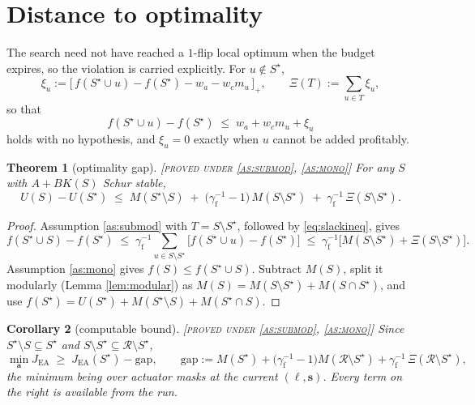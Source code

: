 \documentclass[11pt]{article}
\newtheorem{theorem}{Theorem}
\newtheorem{corollary}[theorem]{Corollary}
\theoremstyle{definition}
\theoremstyle{remark}
\newcommand{\JEA}{J_{\mathrm{EA}}}
\newcommand{\gf}{\gamma_{\mathrm{f}}}
\newcommand{\Rset}{\mathcal{R}}
\newcommand{\Sstar}{S^{\star}}
\newcommand{\tagged}[1]{\textsc{[#1]}}
\begin{document}
\section{Distance to optimality}

The search need not have reached a $1$-flip local optimum when the budget expires,
so the violation is carried explicitly. For $u \notin \Sstar$,
\begin{equation}\label{eq:slack}
  \xi_u := \bigl[\,f(\Sstar \cup u) - f(\Sstar) - w_a - w_c m_u\,\bigr]_+ ,
  \qquad
  \Xi(T) := \sum_{u \in T} \xi_u ,
\end{equation}
so that
\begin{equation}\label{eq:slackineq}
  f(\Sstar \cup u) - f(\Sstar) \;\leq\; w_a + w_c m_u + \xi_u
\end{equation}
holds with no hypothesis, and $\xi_u = 0$ exactly when $u$ cannot be added
profitably.

\begin{theorem}[optimality gap]\label{thm:gap} \tagged{proved under \ref{as:submod}, \ref{as:mono}}
For any $S$ with $A+BK(S)$ Schur stable,
\begin{equation}\label{eq:gap}
  U(S) - U(\Sstar)
  \;\leq\; M(\Sstar \setminus S)
  \;+\; \bigl(\gf^{-1} - 1\bigr)\,M(S \setminus \Sstar)
  \;+\; \gf^{-1}\,\Xi(S \setminus \Sstar).
\end{equation}
\end{theorem}

\begin{proof}
Assumption \ref{as:submod} with $T = S \setminus \Sstar$, followed by
\eqref{eq:slackineq}, gives
\begin{equation*}
  f(\Sstar \cup S) - f(\Sstar)
  \;\leq\; \gf^{-1}\!\!\!\sum_{u \in S \setminus \Sstar}\!\!\!
    \bigl[f(\Sstar \cup u) - f(\Sstar)\bigr]
  \;\leq\; \gf^{-1}\bigl[M(S \setminus \Sstar) + \Xi(S \setminus \Sstar)\bigr].
\end{equation*}
Assumption \ref{as:mono} gives $f(S) \leq f(\Sstar \cup S)$. Subtract $M(S)$, split
it modularly (Lemma \ref{lem:modular}) as
$M(S) = M(S \setminus \Sstar) + M(S \cap \Sstar)$, and use
$f(\Sstar) = U(\Sstar) + M(\Sstar \setminus S) + M(\Sstar \cap S)$.
\end{proof}

\begin{corollary}[computable bound]\label{cor:gap} \tagged{proved under \ref{as:submod}, \ref{as:mono}}
Since $\Sstar \setminus S \subseteq \Sstar$ and
$S \setminus \Sstar \subseteq \Rset \setminus \Sstar$,
\begin{equation}\label{eq:gapcomp}
  \min_{\mathbf{a}} \JEA \;\geq\; \JEA(\Sstar) - \mathrm{gap},
  \qquad
  \mathrm{gap} := M(\Sstar)
  + \bigl(\gf^{-1}\!-\!1\bigr) M(\Rset \setminus \Sstar)
  + \gf^{-1}\,\Xi(\Rset \setminus \Sstar),
\end{equation}
the minimum being over actuator masks at the current $(\ell,\mathbf{s})$. Every
term on the right is available from the run.
\end{corollary}
\end{document}
